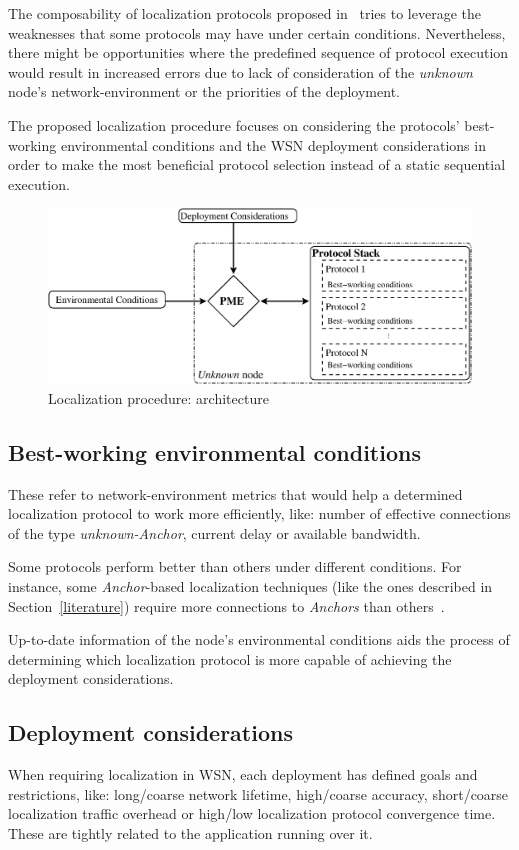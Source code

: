 The composability of localization protocols proposed in~\cite{composability} tries to leverage the weaknesses that some protocols may have under certain conditions. Nevertheless, there might be opportunities where the predefined sequence of protocol execution would result in increased errors due to lack of consideration of the \emph{unknown} node's network-environment or the priorities of the deployment.

The proposed localization procedure focuses on considering the protocols' best-working environmental conditions and the WSN deployment considerations in order to make the most beneficial protocol selection instead of a static sequential execution.

\begin{figure}[htbp]
  \centering
  \includegraphics[width=0.83\linewidth]{section3/figures/LocProc_small.eps}
  \caption{Localization procedure: architecture
  \label{fig:LocProc}}
\end{figure}

\subsection{Best-working environmental conditions}\label{bestWorkingConditions}
These refer to network-environment metrics that would help a determined localization protocol to work more efficiently, like: number of effective connections of the type \emph{unknown-Anchor}, current delay or available bandwidth. 

Some protocols perform better than others under different conditions. For instance, some \emph{Anchor}-based localization techniques (like the ones described in Section~\ref{literature}) require more connections to \emph{Anchors} than others~\cite{rang:loc:techniques}.

Up-to-date information of the node's environmental conditions aids the process of determining which localization protocol is more capable of achieving the deployment considerations.

\subsection{Deployment considerations}\label{deploymentConsiderations}
When requiring localization in WSN, each deployment has defined goals and restrictions, like: long/coarse network lifetime, high/coarse accuracy, short/coarse localization traffic overhead or high/low localization protocol convergence time. These are tightly related to the application running over it.

